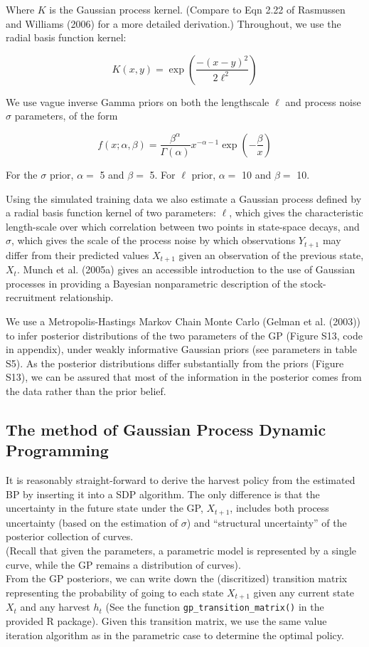 \documentclass[]{components/elsarticle}
\begin{document}
Where $K$ is the Gaussian process kernel. (Compare to Eqn 2.22 of
Rasmussen and Williams (2006) for a more detailed derivation.)
Throughout, we use the radial basis function kernel:

\[ K(x,y) = \exp\left(\frac{-(x-y)^2}{2 \ell^2} \right)\]

We use vague inverse Gamma priors on both the lengthscale $\ell$ and
process noise $\sigma$ parameters, of the form

\[f(x; \alpha, \beta) = \frac{\beta^\alpha}{\Gamma(\alpha)} x^{-\alpha - 1}\exp\left(-\frac{\beta}{x}\right)\]

For the $\sigma$ prior, $\alpha = $ 5 and $\beta = $ 5. For $\ell$
prior, $\alpha = $ 10 and $\beta = $ 10.

Using the simulated training data we also estimate a Gaussian process
defined by a radial basis function kernel of two parameters: $\ell$,
which gives the characteristic length-scale over which correlation
between two points in state-space decays, and $\sigma$, which gives the
scale of the process noise by which observations $Y_{t+1}$ may differ
from their predicted values $X_{t+1}$ given an observation of the
previous state, $X_t$. Munch et al. (2005a) gives an accessible
introduction to the use of Gaussian processes in providing a Bayesian
nonparametric description of the stock-recruitment relationship.

We use a Metropolis-Hastings Markov Chain Monte Carlo (Gelman et al.
(2003)) to infer posterior distributions of the two parameters of the GP
(Figure S13, code in appendix), under weakly informative Gaussian priors
(see parameters in table S5). As the posterior distributions differ
substantially from the priors (Figure S13), we can be assured that most
of the information in the posterior comes from the data rather than the
prior belief.

\subsection{The method of Gaussian Process Dynamic
Programming}\label{the-method-of-gaussian-process-dynamic-programming}

It is reasonably straight-forward to derive the harvest policy from the
estimated BP by inserting it into a SDP algorithm. The only difference
is that the uncertainty in the future state under the GP, $X_{t+1}$,
includes both process uncertainty (based on the estimation of $\sigma$)
and ``structural uncertainty'' of the posterior collection of
curves.\\(Recall that given the parameters, a parametric model is
represented by a single curve, while the GP remains a distribution of
curves).\\From the GP posteriors, we can write down the (discritized)
transition matrix representing the probability of going to each state
$X_{t+1}$ given any current state $X_t$ and any harvest $h_t$ (See the
function \texttt{gp\_transition\_matrix()} in the provided R package).
Given this transition matrix, we use the same value iteration algorithm
as in the parametric case to determine the optimal policy.
\end{document}
